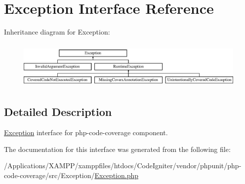 \hypertarget{interface_sebastian_bergmann_1_1_code_coverage_1_1_exception}{}\section{Exception Interface Reference}
\label{interface_sebastian_bergmann_1_1_code_coverage_1_1_exception}
Inheritance diagram for Exception\+:\begin{figure}[H]
\begin{center}
\leavevmode
\includegraphics[height=2.372881cm]{interface_sebastian_bergmann_1_1_code_coverage_1_1_exception}
\end{center}
\end{figure}


\subsection{Detailed Description}
\mbox{\hyperlink{interface_sebastian_bergmann_1_1_code_coverage_1_1_exception}{Exception}} interface for php-\/code-\/coverage component. 

The documentation for this interface was generated from the following file\+:\begin{DoxyCompactItemize}
\item 
/\+Applications/\+X\+A\+M\+P\+P/xamppfiles/htdocs/\+Code\+Igniter/vendor/phpunit/php-\/code-\/coverage/src/\+Exception/\mbox{\hyperlink{phpunit_2php-code-coverage_2src_2_exception_2_exception_8php}{Exception.\+php}}\end{DoxyCompactItemize}
